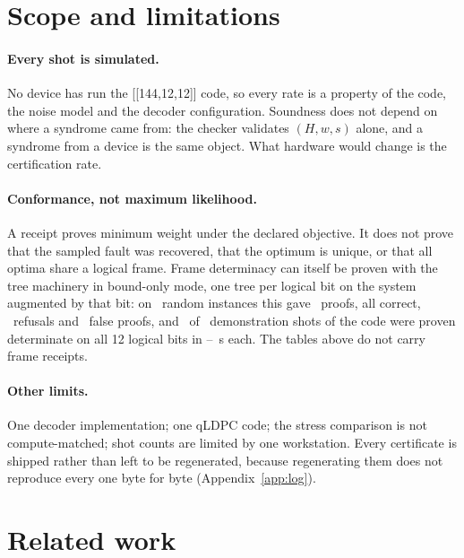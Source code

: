 \documentclass[aps,pra,twocolumn,superscriptaddress,nofootinbib,longbibliography,floatfix]{revtex4-2}
\begin{document}
\section{Scope and limitations}
\label{sec:scope}

\paragraph*{Every shot is simulated.} No device has run the [[144,12,12]] code, so every rate is a property of the code, the noise model and the decoder configuration. Soundness does not depend on where a syndrome came from: the checker validates $(H,w,s)$ alone, and a syndrome from a device is the same object. What hardware would change is the certification rate.

\paragraph*{Conformance, not maximum likelihood.} A receipt proves minimum weight under the declared objective. It does not prove that the sampled fault was recovered, that the optimum is unique, or that all optima share a logical frame. Frame determinacy can itself be proven with the tree machinery in bound-only mode, one tree per logical bit on the system augmented by that bit: on \FrameValInstances\ random instances this gave \FrameValProofs\ proofs, all correct, \FrameValRefusals\ refusals and \FrameValFalse\ false proofs, and \FrameAllCertified\ of \FrameShots\ demonstration shots of the code were proven determinate on all 12 logical bits in \FrameSecLo--\FrameSecHi\ s each. The tables above do not carry frame receipts.

\paragraph*{Other limits.} One decoder implementation; one qLDPC code; the stress comparison is not compute-matched; shot counts are limited by one workstation. Every certificate is shipped rather than left to be regenerated, because regenerating them does not reproduce every one byte for byte (Appendix~\ref{app:log}).

\section{Related work}
\label{sec:related}
\end{document}
